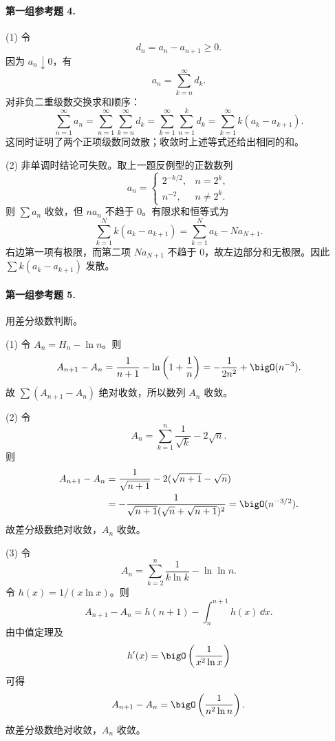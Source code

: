 \paragraph{第一组参考题 4.}
\begin{xsolution}
(1) 令
\[
 d_n=a_n-a_{n+1}\geq0.
\]
因为 $a_n\downarrow0$，有
\[
 a_n=\sum_{k=n}^{\infty}d_k.
\]
对非负二重级数交换求和顺序：
\[
 \sum_{n=1}^{\infty}a_n
 =\sum_{n=1}^{\infty}\sum_{k=n}^{\infty}d_k
 =\sum_{k=1}^{\infty}\sum_{n=1}^{k}d_k
 =\sum_{k=1}^{\infty}k(a_k-a_{k+1}).
\]
这同时证明了两个正项级数同敛散；收敛时上述等式还给出相同的和。

(2) 非单调时结论可失败。取上一题反例型的正数数列
\[
 a_n=\begin{cases}
 2^{-k/2},&n=2^k,\\
 n^{-2},&n\neq2^k.
 \end{cases}
\]
则 $\sum a_n$ 收敛，但 $na_n$ 不趋于 $0$。有限求和恒等式为
\[
 \sum_{k=1}^{N}k(a_k-a_{k+1})
 =\sum_{k=1}^{N}a_k-Na_{N+1}.
\]
右边第一项有极限，而第二项 $Na_{N+1}$ 不趋于 $0$，故左边部分和无极限。因此 $\sum k(a_k-a_{k+1})$ 发散。
\end{xsolution}

\paragraph{第一组参考题 5.}
\begin{xsolution}
用差分级数判断。

(1) 令 $A_n=H_n-\ln n$。则
\[
 A_{n+1}-A_n
 =\frac1{n+1}-\ln\left(1+\frac1n\right)
 =-\frac1{2n^2}+\bigO(n^{-3}).
\]
故 $\sum(A_{n+1}-A_n)$ 绝对收敛，所以数列 $A_n$ 收敛。

(2) 令
\[
 A_n=\sum_{k=1}^{n}\frac1{\sqrt k}-2\sqrt n.
\]
则
\[
 \begin{aligned}
 A_{n+1}-A_n
 &=\frac1{\sqrt{n+1}}-2(\sqrt{n+1}-\sqrt n)\\
 &=-\frac1{\sqrt{n+1}(\sqrt n+\sqrt{n+1})^2}
 =\bigO(n^{-3/2}).
 \end{aligned}
\]
故差分级数绝对收敛，$A_n$ 收敛。

(3) 令
\[
 A_n=\sum_{k=2}^{n}\frac1{k\ln k}-\ln\ln n.
\]
令 $h(x)=1/(x\ln x)$。则
\[
 A_{n+1}-A_n=h(n+1)-\int_n^{n+1}h(x)\,\dd x.
\]
由中值定理及
\[
 h'(x)=\bigO\left(\frac1{x^2\ln x}\right)
\]
可得
\[
 A_{n+1}-A_n=\bigO\left(\frac1{n^2\ln n}\right).
\]
故差分级数绝对收敛，$A_n$ 收敛。
\end{xsolution}

